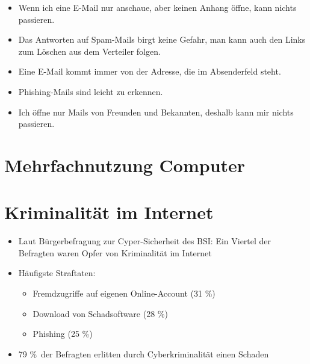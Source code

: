 \begin{frame}
\begin{itemize}
	\item Wenn ich eine E-Mail nur anschaue, aber keinen Anhang öffne, kann nichts passieren.
	\item Das Antworten auf Spam-Mails birgt keine Gefahr, man kann auch den Links zum Löschen aus dem Verteiler folgen.
	\item Eine E-Mail kommt immer von der Adresse, die im Absenderfeld steht.
	\item Phishing-Mails sind leicht zu erkennen.
	\item Ich öffne nur Mails von Freunden und Bekannten, deshalb kann mir nichts passieren.
\end{itemize}
\end{frame}

\section{Mehrfachnutzung Computer}


\section{Kriminalität im Internet}

\begin{frame}
\begin{itemize}
  \item Laut Bürgerbefragung zur Cyper-Sicherheit des BSI: Ein Viertel der Befragten waren Opfer von Kriminalität im Internet
  \item Häufigste Straftaten:
  \begin{itemize}
    \item Fremdzugriffe auf eigenen Online-Account (31 \%)
    \item Download von Schadsoftware (28 \%)
    \item Phishing (25 \%)
  \end{itemize}
  \item 79 \%\ der Befragten erlitten durch Cyberkriminalität einen Schaden
\end{itemize}
\end{frame}

